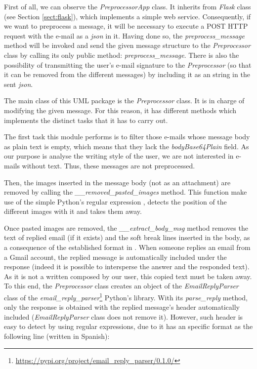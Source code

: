 First of all, we can observe the \textit{PreprocessorApp} class. It inherits from \textit{Flask} class (see Section \ref{sect:flask}), which implements a simple web service. Consequently, if we want to preprocess a message, it will be necessary to execute a POST HTTP request with the e-mail as a \textit{json} in it. Having done so, the \textit{preprocess\_message} method will be invoked and send the given message structure to the \textit{Preprocessor} class by calling its only public method: \textit{preprocess\_message}. There is also the possibility of transmitting the user's e-mail signature to the \textit{Preprocessor} (so that it can be removed from the different messages) by including it as an string in the sent \textit{json}.

The main class of this UML package is the \textit{Preprocessor} class. It is in charge of modifying the given message. For this reason, it has different methods which implements the distinct tasks that it has to carry out.

The first task this module performs is to filter those e-mails whose message body as plain text is empty, which means that they lack the \textit{bodyBase64Plain} field. As our purpose is analyse the writing style of the user, we are not interested in e-mails without text. Thus, these messages are not preprocessed.

Then, the images inserted in the message body (not as an attachment) are removed by calling the \textit{\_\_removed\_pasted\_images} method. This function make use of the simple Python's regular expression \pythoninline{r'\\[image:[\^\\]]+\\]'}, detects the position of the different images with it and takes them away.

Once pasted images are removed, the \textit{\_\_extract\_body\_msg} method removes the text of replied email (if it exists) and the soft break lines inserted in the body, as a consequence of the established format in \cite{rfc2646}. When someone replies an email from a Gmail account, the replied message is automatically included under the response (indeed it is possible to intersperse the answer and the responded text). As it is not a written composed by our user, this copied text must be taken away. To this end, the \textit{Preprocessor} class creates an object of the \textit{EmailReplyParser} class of the \textit{email\_reply\_parser}\footnote{\url{https://pypi.org/project/email_reply_parser/0.1.0/}} Python's library. With its \textit{parse\_reply} method, only the response is obtained with the replied message's header automatically included (\textit{EmailReplyParser} class does not remove it). However, such header is easy to detect by using regular expressions, due to it has an specific format as the following line (written in Spanish):

